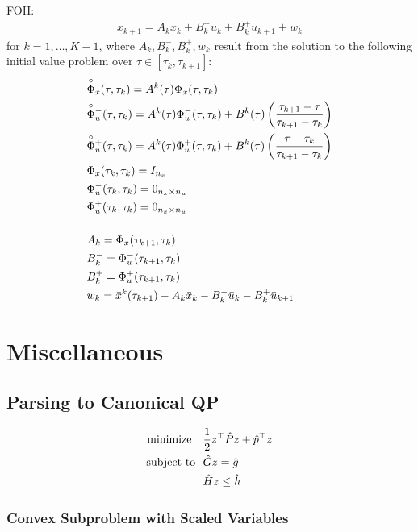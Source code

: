\documentclass[11pt,a4paper]{article}
\begin{document}
FOH:
\begin{align}
    x_{k+1} = A_kx_{k} + B^-_ku_k + B^+_ku_{k+1} + w_k     
\end{align}
for $k=1,\ldots,K-1$, where $A_k,B^-_k,B^+_k,w_k$ result from the solution to the following initial value problem over $\tau\in[\tau_k,\tau_{k+1}]$:
\begin{align*}
    & \overset{\circ}{\Phi}_x(\tau,\tau_k) = A^k(\tau)\Phi_x(\tau,\tau_k)\\ 
    & \overset{\circ}{\Phi}{}^-_u(\tau,\tau_k) = A^k(\tau)\Phi{}^-_u(\tau,\tau_k) + B^k(\tau)\left(\frac{\tau_{k+1}-\tau}{\tau_{k+1}-\tau_k}\right)\\
    & \overset{\circ}{\Phi}{}^+_u(\tau,\tau_k) = A^k(\tau)\Phi{}^+_u(\tau,\tau_k) + B^k(\tau)\left(\frac{\tau-\tau_k}{\tau_{k+1}-\tau_k}\right)\\
    & \Phi_x(\tau_k,\tau_k) = I_{n_x}\\
    & \Phi{}^-_u(\tau_k,\tau_k) = 0_{n_x\times n_u}\\
    & \Phi{}^+_u(\tau_k,\tau_k) = 0_{n_x\times n_u}\\[0.5cm]
    & A_k = \Phi_x(\tau_{k+1},\tau_k)\\
    & B_k^- = \Phi{}^-_u(\tau_{k+1},\tau_k)\\
    & B_k^+ = \Phi{}^+_u(\tau_{k+1},\tau_k)\\
    & w_k = \bar{x}^k(\tau_{k+1}) - A_k\bar{x}_k - B_k^-\bar{u}_{k} - B_{k}^+\bar{u}_{k+1} 
\end{align*}

\section{Miscellaneous}
%
\subsection{Parsing to Canonical QP}
%
\begin{subequations}
\begin{align}
    \mathrm{minimize}~~&~\frac{1}{2}z^\top\hat{P} z + \hat{p}^\top z\\
    \mathrm{subject~to}~&~\hat{G}z = \hat{g}\\
    &~\hat{H}z\le \hat{h} 
\end{align}
\end{subequations}
%
\subsubsection{Convex Subproblem with Scaled Variables}
\end{document}
